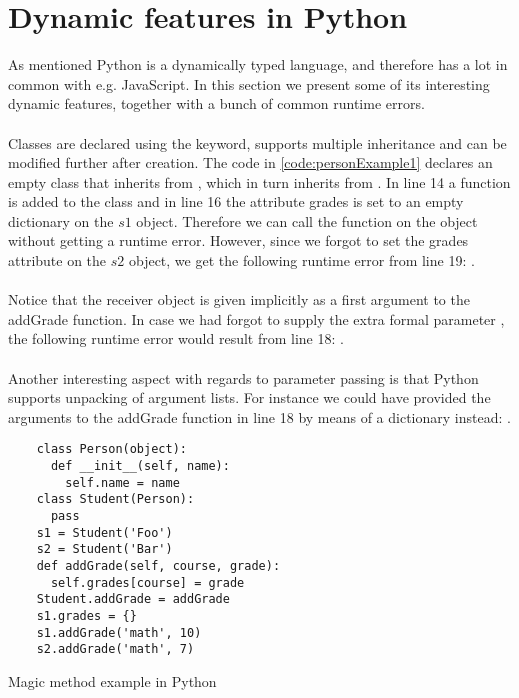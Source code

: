\chapter{Dynamic features in Python}
As mentioned Python is a dynamically typed language, and therefore has a lot in common with e.g. JavaScript. In this section we present some of its interesting dynamic features, together with a bunch of common runtime errors. \\
\\
Classes are declared using the  keyword, supports multiple inheritance and can be modified further after creation. The code in  \ref{code:personExample1} declares an
empty  class that inherits from , which in turn inherits from . In line 14 a function  is added to the  class and in line 16 the attribute grades is set to an empty dictionary on the $s1$ object. Therefore we can call the  function on the  object without getting a runtime error. However, since we forgot to set the grades attribute on the $s2$ object, we get the following runtime error from line 19: . \\
\\
Notice that the receiver object is given implicitly as a first argument to the addGrade function. In case we had forgot to supply the extra formal parameter , the following runtime error would result from line 18: . \\
\\
Another interesting aspect with regards to parameter passing is that Python supports unpacking of argument lists. For instance we could have provided the arguments to the addGrade function in line 18 by means of a dictionary instead: .


\begin{listing}[H]
	\begin{verbatim}
	class Person(object):
	  def __init__(self, name):
	    self.name = name
	class Student(Person):
	  pass
	s1 = Student('Foo')
	s2 = Student('Bar')
	def addGrade(self, course, grade):
	  self.grades[course] = grade
	Student.addGrade = addGrade
	s1.grades = {}
	s1.addGrade('math', 10)
	s2.addGrade('math', 7)
	\end{verbatim}
	\caption{Magic method example in Python}\label{code:personExample1}
\end{listing}

